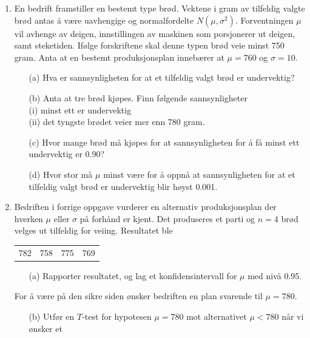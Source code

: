 \begin{enumerate}
\item     En bedrift framstiller en bestemt type brød. Vektene
          i gram av tilfeldig valgte brød antas å være
          uavhengige og normalfordelte $N(\mu ,\sigma ^2)$.
          Forventningen $\mu$ vil avhenge av deigen,
          innstillingen av maskinen som porsjonerer ut deigen,
          samt steketiden. Ifølge forskriftene skal denne
          typen brød veie minst 750 gram. Anta at en bestemt
          produksjonsplan innebærer at $\mu =760$ og
          $\sigma =10$.
 \begin{itemize}        
  \item[(a)]  Hva er sannsynligheten for at et tilfeldig valgt
               brød er undervektig?
  \item[(b)]  Anta at tre brød kjøpes. Finn følgende
               sannsynligheter \\
                  (i) minst ett er undervektig\\
                  (ii) det tyngste brødet veier mer enn 780 gram.
  \item[(c)]  Hvor mange brød må kjøpes for at
               sannsynligheten for å få minst ett
               undervektig er 0.90?
  \item[(d)]  Hvor stor må $\mu$ minst være for å
               oppnå at sannsynligheten for at et tilfeldig valgt brød er
               undervektig blir høyst 0.001.
 \end{itemize}
\item     Bedriften i forrige oppgave vurderer en alternativ
          produksjonsplan der hverken $\mu$ eller $\sigma$ på
          forhånd er kjent. Det produseres et parti og $n=4$
          brød velges ut tilfeldig for veiing. Resultatet ble
         \begin{center}
         \begin{tabular}{cccc}
                782 & 758 & 775 & 769 
         \end{tabular}
         \end{center}
 \begin{itemize}
  \item[(a)]  Rapporter resultatet, og lag et konfidensintervall
               for $\mu$ med nivå 0.95.
 \end{itemize}
          For å være på den sikre siden ønsker
          bedriften  en plan svarende til $\mu=780$.
 \begin{itemize}
  \item[(b)]  Utfør en $T$-test for hypotesen $\mu=780$ mot
               alternativet $\mu < 780$ når vi ønsker et

\end{itemize}
\end{enumerate}
